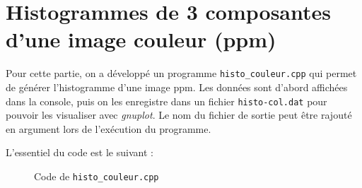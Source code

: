 \documentclass[french,a4paper,10pt]{article}
\begin{document}
	\newpage
	\section{Histogrammes de 3 composantes d'une image couleur (ppm)}


	Pour cette partie, on a d\'evelopp\'e un programme \texttt{histo\_couleur.cpp} qui permet de g\'en\'erer
	l'histogramme d'une image ppm.
	Les données sont d'abord affichées dans la console, puis on les enregistre dans un fichier \texttt{histo-col.dat}
	pour pouvoir les visualiser avec \emph{gnuplot}.
	Le nom du fichier de sortie peut être rajouté en argument lors de l'exécution du programme.

	L'essentiel du code est le suivant : %
	\begin{figure}[!htb]
		\centering
		\caption{Code de \texttt{histo\_couleur.cpp}}\label{Fig:histo-couleur-code}
	\end{figure}
\end{document}
